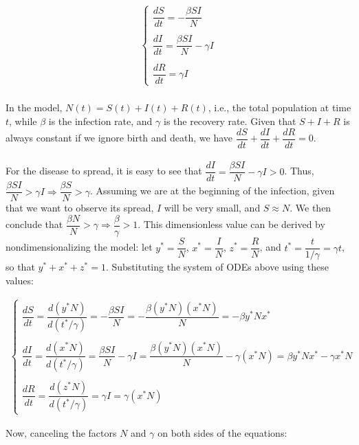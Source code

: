 \begin{gather*}
\begin{cases}
\dfrac{dS}{dt} = -\dfrac{\beta SI}{N} \\
\\
\dfrac{dI}{dt} = \dfrac{\beta SI}{N} - \gamma I \\
\\
\dfrac{dR}{dt} = \gamma I
\end{cases}
\end{gather*}
\\
In the model, $N(t) = S(t) + I(t) + R(t)$, i.e., the total population 
at time $t$, while $\beta$ is the infection rate, and $\gamma$ is the
recovery rate. Given that $S + I + R$ is always constant if we 
ignore birth and death, we have 
$\dfrac{dS}{dt} + \dfrac{dI}{dt} + \dfrac{dR}{dt} = 0$.
\\\\
For the disease to spread, it is easy to see that 
$\dfrac{dI}{dt} = \dfrac{\beta SI}{N} - \gamma I > 0$. 
Thus, $\dfrac{\beta SI}{N} > \gamma I \Rightarrow \dfrac{\beta S}{N} > \gamma$. 
Assuming we are at the beginning of the infection, given 
that we want to observe its spread, $I$ will be very small, 
and $S \approx N$. We then conclude that 
$\dfrac{\beta N}{N} > \gamma \Rightarrow \dfrac{\beta}{\gamma} > 1$. 
This dimensionless value can be derived by nondimensionalizing 
the model: 
let $y^* = \dfrac{S}{N}$, $x^* = \dfrac{I}{N}$, $z^* = \dfrac{R}{N}$, 
and $t^* = \dfrac{t}{1/\gamma} = \gamma t$, so that $y^* + x^* + z^* = 1$. 
Substituting the system of ODEs above using these values:


\begin{gather*}
\begin{cases}
\dfrac{dS}{dt} = \dfrac{d(y^*N)}{d(t^*/\gamma)} = -\dfrac{\beta SI}{N} = -\dfrac{\beta(y^*N)(x^*N)}{N} = -\beta y^*Nx^* \\
\\
\dfrac{dI}{dt} = \dfrac{d(x^*N)}{d(t^*/\gamma)} = \dfrac{\beta SI}{N} - \gamma I = \dfrac{\beta(y^*N)(x^*N)}{N} -\gamma(x^*N) = \beta y^*Nx^* - \gamma x^*N \\
\\
\dfrac{dR}{dt} = \dfrac{d(z^*N)}{d(t^*/\gamma)} = \gamma I = \gamma(x^*N)
\end{cases}
\end{gather*}

Now, canceling the factors $N$ and $\gamma$ on both sides of the equations:

